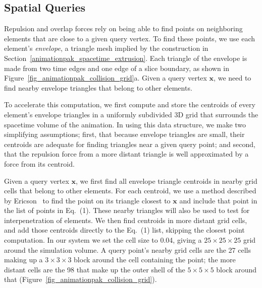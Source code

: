 \subsection{Spatial Queries}
\label{animationpak_spatial_queries}



Repulsion and overlap forces rely on being able to find points on
neighboring elements that are close to a given query vertex.
To find these points, we use each element's
\textit{envelope}, a triangle mesh implied by the construction in
Section~\ref{animationpak_spacetime_extrusion}.  Each triangle of the envelope 
is made from two time edges and one edge of a slice boundary, as
shown in Figure~\ref{fig_animationpak_collision_grid}a.  Given a query vertex 
$\bm{x}$, we need to find nearby envelope triangles that belong to
other elements.

To accelerate this computation, we first compute and store the centroids of
every element's envelope triangles in a uniformly subdivided 3D grid that
surrounds the spacetime volume of the animation.  In using this data
structure, we make two simplifying assumptions; first, that because 
envelope triangles are small, their centroids
are adequate for finding triangles near a given query point; and second,
that the repulsion force from a more distant triangle is well approximated
by a force from its centroid.

Given a query vertex $\bm{x}$, we first find all envelope triangle
centroids in nearby grid cells that belong to other elements.  For each 
centroid, we use a method described by Ericson~\cite{Ericson2005} to
find the point on its triangle closest to $\bm{x}$ and
include that point in the list of points in Eq.~(1).  These
nearby triangles will also be used to test for interpenetration of elements.
We then find centroids in more distant grid cells, and add
those centroids directly to the Eq.~(1) list, skipping the closest point computation.
In our system we set the cell size to 0.04, giving a $25\times 25\times 25$
grid around the simulation volume.  A query point's nearby grid cells 
are the 27 cells making up a $3\times 3\times 3$ block around the cell 
containing the point; the more distant cells are the 98 that make up the
outer shell of the $5\times 5\times 5$ block around that 
(Figure~\ref{fig_animationpak_collision_grid}).


